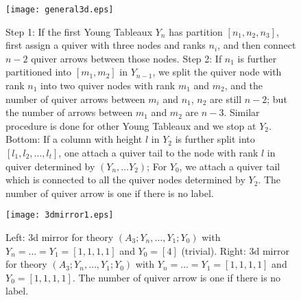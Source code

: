 \documentclass[a4paper,11pt]{article}
\begin{document}
\begin{figure}[htbp]
\small
\centering
\texttt{[image: general3d.eps]} 
\caption{Step 1: If the first Young Tableaux $Y_n$ has partition $[n_1, n_2, n_3]$, first assign a quiver  with three nodes and ranks $n_i$, and then connect $n-2$  quiver arrows
between those nodes. Step 2: If  $n_1$ is further partitioned into $[m_1, m_2]$ in $Y_{n-1}$, we split the quiver node with rank $n_1$ into two quiver nodes 
with rank $m_1$ and $m_2$, and the number of quiver arrows between $m_i$ and $n_1$, $n_2$ are still $n-2$; but  the number of arrows between $m_1$ and $m_2$ are $n-3$. 
Similar procedure is done for other Young Tableaux and we stop at $Y_2$. Bottom: If a  column with height $l$ in $Y_2$ is further split into $[l_1, l_2,\ldots,l_t]$, one attach 
a quiver tail to the node with rank $l$  in quiver  determined by $(Y_n,\ldots Y_2)$; For $Y_0$, we attach a quiver tail which is connected to all the quiver nodes determined by $Y_2$.
The number of quiver arrow is one if there is no label.  }
\label{3dge}
\end{figure}
\begin{figure}[h]
\centering
  \texttt{[image: 3dmirror1.eps]}
  \caption{Left:  3d mirror for theory $(A_{3}; Y_{n}, \ldots, Y_{1}; Y_0)$ with $Y_n=\ldots=Y_1=[1,1,1,1]$ and $Y_0=[4]$ (trivial). Right: 3d mirror for theory $(A_{3}; Y_{n}, \ldots, Y_{1}; Y_0)$ with $Y_n=\ldots=Y_1=[1,1,1, 1]$ and $Y_0=[1,1,1,1]$.
  The number of quiver arrow is one if there is no label.}
  \label{3d1}
\end{figure}
\end{document}
